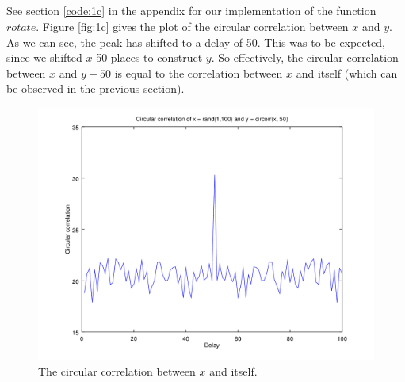 \documentclass{article}
\begin{document}
\subsection{}
See section \ref{code:1c} in the appendix for our implementation of the function $rotate$. Figure \ref{fig:1c} gives the plot of the circular correlation between $x$ and $y$. As we can see, the peak has shifted to a delay of 50. This was to be expected, since we shifted $x$ 50 places to construct $y$. So effectively, the circular correlation between $x$ and $y-50$ is equal to the correlation between $x$ and itself (which can be observed in the previous section).
\begin{figure}[H]
	\centering
	\includegraphics[width=.7\textwidth]{plot1c.png}
	\caption{The circular correlation between $x$ and itself.}
	\label{fig:1b2}
\end{figure}
\end{document}
